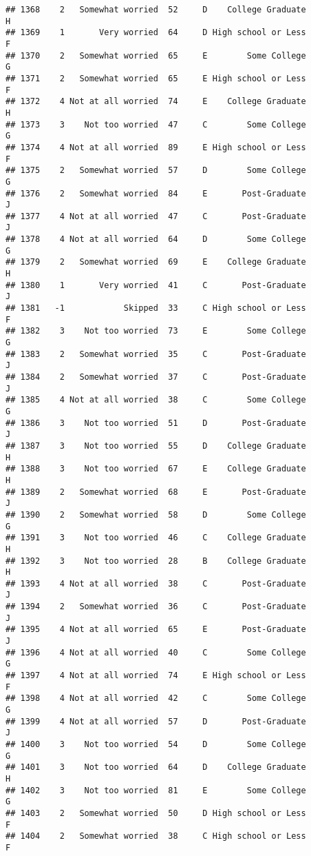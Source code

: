 \documentclass[
]{article}
\begin{document}
\begin{verbatim}
## 1368    2   Somewhat worried  52     D    College Graduate         H
## 1369    1       Very worried  64     D High school or Less         F
## 1370    2   Somewhat worried  65     E        Some College         G
## 1371    2   Somewhat worried  65     E High school or Less         F
## 1372    4 Not at all worried  74     E    College Graduate         H
## 1373    3    Not too worried  47     C        Some College         G
## 1374    4 Not at all worried  89     E High school or Less         F
## 1375    2   Somewhat worried  57     D        Some College         G
## 1376    2   Somewhat worried  84     E       Post-Graduate         J
## 1377    4 Not at all worried  47     C       Post-Graduate         J
## 1378    4 Not at all worried  64     D        Some College         G
## 1379    2   Somewhat worried  69     E    College Graduate         H
## 1380    1       Very worried  41     C       Post-Graduate         J
## 1381   -1            Skipped  33     C High school or Less         F
## 1382    3    Not too worried  73     E        Some College         G
## 1383    2   Somewhat worried  35     C       Post-Graduate         J
## 1384    2   Somewhat worried  37     C       Post-Graduate         J
## 1385    4 Not at all worried  38     C        Some College         G
## 1386    3    Not too worried  51     D       Post-Graduate         J
## 1387    3    Not too worried  55     D    College Graduate         H
## 1388    3    Not too worried  67     E    College Graduate         H
## 1389    2   Somewhat worried  68     E       Post-Graduate         J
## 1390    2   Somewhat worried  58     D        Some College         G
## 1391    3    Not too worried  46     C    College Graduate         H
## 1392    3    Not too worried  28     B    College Graduate         H
## 1393    4 Not at all worried  38     C       Post-Graduate         J
## 1394    2   Somewhat worried  36     C       Post-Graduate         J
## 1395    4 Not at all worried  65     E       Post-Graduate         J
## 1396    4 Not at all worried  40     C        Some College         G
## 1397    4 Not at all worried  74     E High school or Less         F
## 1398    4 Not at all worried  42     C        Some College         G
## 1399    4 Not at all worried  57     D       Post-Graduate         J
## 1400    3    Not too worried  54     D        Some College         G
## 1401    3    Not too worried  64     D    College Graduate         H
## 1402    3    Not too worried  81     E        Some College         G
## 1403    2   Somewhat worried  50     D High school or Less         F
## 1404    2   Somewhat worried  38     C High school or Less         F

\end{verbatim}
\end{document}
